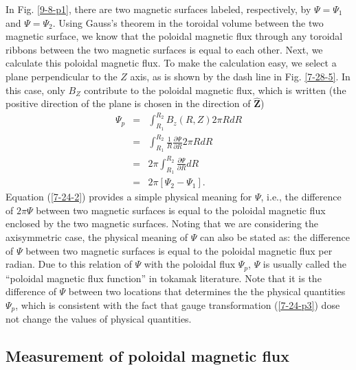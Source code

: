 \documentclass{article}
\begin{document}
In Fig. \ref{9-8-p1}, there are two magnetic surfaces labeled, respectively,
by $\Psi = \Psi_1$ and $\Psi = \Psi_2$. Using Gauss's theorem in the toroidal
volume between the two magnetic surface, we know that the poloidal magnetic
flux through any toroidal ribbons between the two magnetic surfaces is equal
to each other. Next, we calculate this poloidal magnetic flux. To make the
calculation easy, we select a plane perpendicular to the $Z$ axis, as is shown
by the dash line in Fig. \ref{7-28-5}. In this case, only $B_Z$ contribute to
the poloidal magnetic flux, which is written (the positive direction of the
plane is chosen in the direction of $\hat{\mathbf{Z}}$)
\begin{eqnarray}
  \Psi_p & = & \int_{R_1}^{R_2} B_z (R, Z) 2 \pi R d R \nonumber\\
  & = & \int_{R_1}^{R_2} \frac{1}{R}  \frac{\partial \Psi}{\partial R} 2 \pi
  R d R \nonumber\\
  & = & 2 \pi \int^{R_2}_{R_1} \frac{\partial \Psi}{\partial R} d R
  \nonumber\\
  & = & 2 \pi [\Psi_2 - \Psi_1] .  \label{7-24-2}
\end{eqnarray}
Equation (\ref{7-24-2}) provides a simple physical meaning for $\Psi$, i.e.,
the difference of $2 \pi \Psi$ between two magnetic surfaces is equal to the
poloidal magnetic flux enclosed by the two magnetic surfaces. Noting that we
are considering the axisymmetric case, the physical meaning of $\Psi$ can also
be stated as: the difference of $\Psi$ between two magnetic surfaces is equal
to the poloidal magnetic flux per radian. Due to this relation of $\Psi$ with
the poloidal flux $\Psi_p$, $\Psi$ is usually called the ``poloidal magnetic
flux function'' in tokamak literature. Note that it is the difference of
$\Psi$ between two locations that determines the the physical quantities
$\Psi_p$, which is consistent with the fact that gauge transformation
(\ref{7-24-p3}) dose not change the values of physical quantities.

\subsection{Measurement of poloidal magnetic flux}
\end{document}
